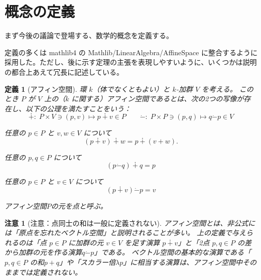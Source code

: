\documentclass[a4paper,12pt]{bxjsbook}
\newlength{\customindent}
\newenvironment{body}{
  \par
  \begingroup
  \setlength{\leftskip}{\customindent}
  \setlength{\rightskip}{0pt}
  \setlength{\parindent}{1em}
  \setlength{\displayindent}{\customindent}
  \setlength{\displaywidth}{\dimexpr\linewidth-\customindent\relax}
}{
  \par
  \endgroup
}
\theoremstyle{theorem}
\newtheorem{definition}[theorem]{定義}
\newtheorem{remark}[theorem]{注意}
\newcommand{\dotminus}{\mathbin{\dot{-}}}
\begin{document}
    \section{概念の定義}
    \begin{body}
      \indent まず今後の議論で登場する、数学的概念を定義する。

      \indent 定義の多くは mathlib4 の Mathlib/LinearAlgebra/AffineSpace に整合するように採用した。ただし、後に示す定理の主張を表現しやすいように、いくつかは説明の都合上あえて冗長に記述している。
    \end{body}

    \begin{definition}[アフィン空間]
      環 $k$（体でなくともよい）と $k$-加群 $V$ を考える。
      このとき $P$ が $V$ 上の（$k$ に関する）\emph{アフィン空間}であるとは、次の2つの写像が存在し、以下の公理を満たすことをいう：
      \[
      \dotplus :\; P\times V \ni (p,v) \mapsto p \dotplus v \in P
      \qquad
      \dotminus:\; P\times P \ni (p,q) \mapsto q \dotminus p \in V
      \]
      \begin{theoremitemize}[leftmargin=3.5em, topsep=2pt, partopsep=0pt, itemsep=0pt, parsep=0pt]
        \item[\hspace*{5em}\textbf{公理1}] 任意の $p\in P$ と $v,w\in V$ について
          \[
            (p\dotplus v)\dotplus w = p\dotplus (v+w).
          \]
        \item[\hspace*{5em}\textbf{公理2}] 任意の $p,q\in P$ について
        \[
          (p\dotminus q)\dotplus q = p
        \]
        \item[\hspace*{5em}\textbf{公理3}] 任意の $p\in P$ と $v\in V$ について
        \[
          (p\dotplus v)\dotminus p = v
        \]
      \end{theoremitemize}
      アフィン空間$P$の元を\emph{点}と呼ぶ。
  \end{definition}
  
  \begin{remark}[注意：点同士の和は一般に定義されない]
    アフィン空間とは、非公式には「原点を忘れたベクトル空間」と説明されることが多い。
    上の定義で与えられるのは「点 $p\in P$ に加群の元 $v\in V$ を足す演算 $p\dotplus v$」と「2点 $p,q\in P$ の差から加群の元を作る演算$q\dotminus p$」である。
    ベクトル空間の基本的な演算である「$p,q\in P$ の和$p+q$」や「スカラー倍$\lambda p$」に相当する演算は、アフィン空間中そのままでは定義されない。
  \end{remark}
\end{document}
